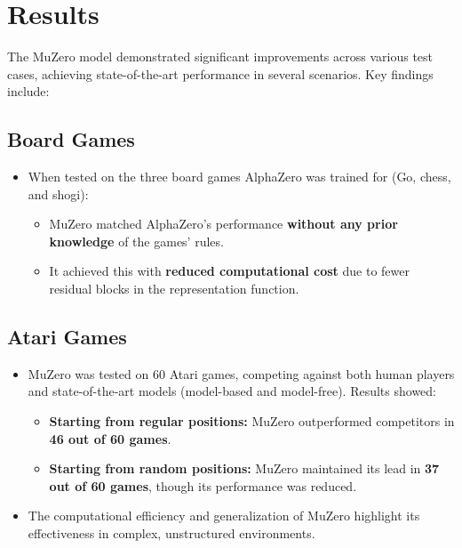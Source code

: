 \documentclass{article}
\begin{document}
\section*{Results}
The MuZero model demonstrated significant improvements across various test cases, achieving state-of-the-art performance in several scenarios. Key findings include:

\subsection*{Board Games}
\begin{itemize}
    \item When tested on the three board games AlphaZero was trained for (Go, chess, and shogi):
    \begin{itemize}
        \item MuZero matched AlphaZero's performance \textbf{without any prior knowledge} of the games' rules.
        \item It achieved this with \textbf{reduced computational cost} due to fewer residual blocks in the representation function.
    \end{itemize}
\end{itemize}

\subsection*{Atari Games}
\begin{itemize}
    \item MuZero was tested on 60 Atari games, competing against both human players and state-of-the-art models (model-based and model-free). Results showed:
    \begin{itemize}
        \item \textbf{Starting from regular positions:} MuZero outperformed competitors in \textbf{46 out of 60 games}.
        \item \textbf{Starting from random positions:} MuZero maintained its lead in \textbf{37 out of 60 games}, though its performance was reduced.
    \end{itemize}
    \item The computational efficiency and generalization of MuZero highlight its effectiveness in complex, unstructured environments.
\end{itemize}
\end{document}
